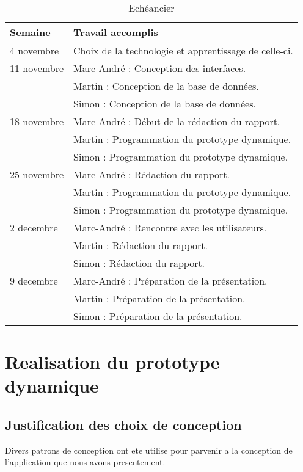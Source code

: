 \documentclass[letterpaper, oneside, 12pt, these, creativecommons]{thETS}
\begin{document}
\begin{table}
	\centering
	\begin{tabular}{|l|l|}
		\hline
		Semaine	& Travail accomplis 								\\ \hline
		4 novembre	& Choix de la technologie et apprentissage de celle-ci.		\\ \hline
		11 novembre	& Marc-André : Conception des interfaces. 				\\
				& Martin : Conception de la base de données.				\\
				& Simon : Conception de la base de données.				\\ \hline
		18 novembre	& Marc-André : Début de la rédaction du rapport. 			\\ 
				& Martin : Programmation du prototype dynamique. 			\\
				& Simon : Programmation du prototype dynamique. 			\\ \hline
		25 novembre	& Marc-André : Rédaction du rapport.		 			\\
				& Martin : Programmation du prototype dynamique. 			\\ 
				& Simon : Programmation du prototype dynamique.		 	\\ \hline
		2 decembre	& Marc-André : Rencontre avec les utilisateurs. 			\\
				& Martin : Rédaction du rapport.						\\
				& Simon : Rédaction du rapport.						\\ \hline
		9 decembre	& Marc-André : Préparation de la présentation.	 		\\ 
				& Martin : Préparation de la présentation.	 			\\ 
				& Simon : Préparation de la présentation.	 			\\ \hline
	\end{tabular}
	\caption{Echéancier}
\end{table}

\chapter{Realisation du prototype dynamique}

\section{Justification des choix de conception}

Divers patrons de conception ont ete utilise pour parvenir a la conception de l'application que nous avons presentement. 
\end{document}
